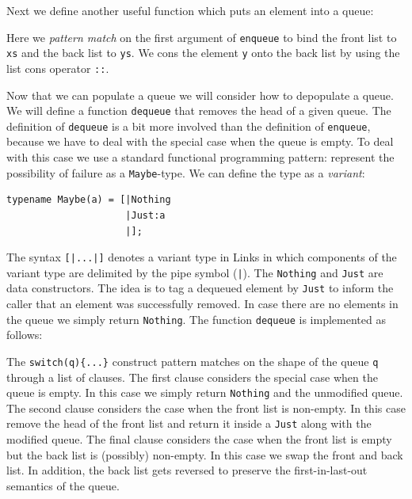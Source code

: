 \documentclass[12pt,mscres,cdtppar,twoside,openright,logo,rightchapter,normalheadings]{infthesis}
\newcommand{\snippet}[1]{}
\theoremstyle{definition}
\begin{document}
Next we define another useful function which puts an element into a queue: 
%
\snippet{enqueue.links}
%
Here we \emph{pattern match} on the first argument of
\lstinline$enqueue$ to bind the front list to \lstinline$xs$ and the
back list to \lstinline$ys$. We cons the element \lstinline$y$ onto
the back list by using the list cons operator \lstinline$::$.

Now that we can populate a queue we will consider how to depopulate a
queue. We will define a function \lstinline$dequeue$ that removes the
head of a given queue. The definition of \lstinline$dequeue$ is a bit
more involved than the definition of \lstinline$enqueue$, because we
have to deal with the special case when the queue is empty. To deal
with this case we use a standard functional programming pattern:
represent the possibility of failure as a \lstinline$Maybe$-type. We
can define the type as a \emph{variant}:
%
\begin{lstlisting}
typename Maybe(a) = [|Nothing
                     |Just:a
                     |];
\end{lstlisting}
%
The syntax \lstinline$[|...|]$ denotes a variant type in Links in
which components of the variant type are delimited by the pipe symbol
(\lstinline$|$). The \lstinline$Nothing$ and \lstinline$Just$ are data
constructors. The idea is to tag a dequeued element by
\lstinline$Just$ to inform the caller that an element was successfully
removed. In case there are no elements in the queue we simply return
\lstinline$Nothing$. The function \lstinline$dequeue$ is implemented
as follows:
%
\snippet{dequeue.links}
%
The \lstinline$switch(q){...}$ construct pattern matches on the shape
of the queue \lstinline$q$ through a list of clauses. The first clause
considers the special case when the queue is empty. In this case we
simply return \lstinline$Nothing$ and the unmodified queue. The second
clause considers the case when the front list is non-empty. In this
case remove the head of the front list and return it inside a
\lstinline$Just$ along with the modified queue. The final clause
considers the case when the front list is empty but the back list is
(possibly) non-empty. In this case we swap the front and back list. In
addition, the back list gets reversed to preserve the
first-in-last-out semantics of the queue.
\end{document}
